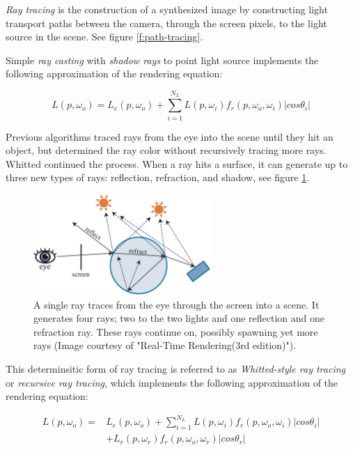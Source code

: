 \textit{Ray tracing} is the construction of a synthesized image by constructing light transport paths between the camera, through the screen pixels, to the light source in the scene. See figure \ref{f:path-tracing}.

Simple \textit{ray casting} \cite[-7mm]{a:Sometechniquesforshadingmachinerenderingsofsolids} with \textit{shadow rays} to point light source implements the following approximation of the rendering equation:

\begin{equation}
	L(p,\omega_o)=L_e(p, \omega_o)+\sum_{i=1}^{N_L}L(p,\omega_i) f_r(p,\omega_o,\omega_i)|cos\theta_i|
\end{equation}

Previous algorithms traced rays from the eye into the scene until they hit an object, but determined the ray color without recursively tracing more rays. Whitted \cite{a:ray-tracing} continued the process. When a ray hits a surface, it can generate up to three new types of rays: reflection, refraction, and shadow, see figure \ref{f:recursive-ray-tracing}. 

\begin{figure}\label{f:recursive-ray-tracing}
	\sidecaption	
	\includegraphics[width=0.6\textwidth]{graphics/gi/path-2}
	\caption{A single ray traces from the eye through the screen into a scene. It generates four rays; two to the two lights and one reflection and one refraction ray. These rays continue on, possibly spawning yet more rays (Image courtesy of "Real-Time Rendering(3rd edition)").}
\end{figure}

This determinsitic form of ray tracing is referred to as \textit{Whitted-style ray tracing} or \textit{recursive ray tracing}, which implements the following approximation of the rendering equation:

\begin{equation}
\begin{aligned}
	L(p,\omega_o)=&L_e(p, \omega_o)+\sum_{i=1}^{N_L}L(p,\omega_i) f_r(p,\omega_o,\omega_i)|cos\theta_i|\\
	&+L_r(p,\omega_r)f_r(p,\omega_o,\omega_r)|cos\theta_r|
\end{aligned}
\end{equation}

